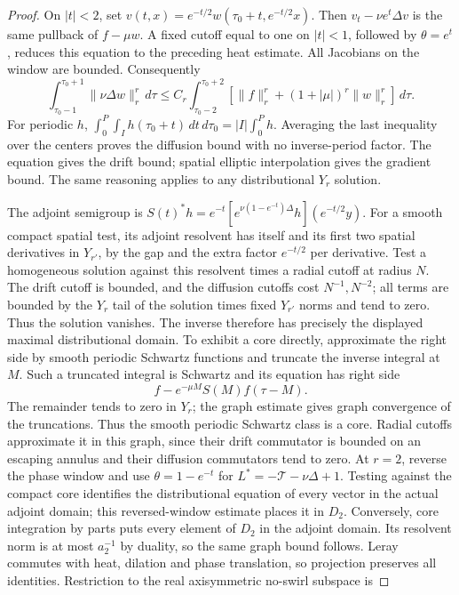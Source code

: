 \begin{proof}
On \(|t|<2\), set
\(v(t,x)=e^{-t/2}w(\tau_0+t,e^{-t/2}x)\).
Then \(v_t-\nu e^t\Delta v\) is the same pullback of \(f-\mu w\).
A fixed cutoff equal to one on \(|t|<1\), followed by
\(\theta=e^t\), reduces this equation to the preceding heat estimate.
All Jacobians on the window are bounded. Consequently
\[
 \int_{\tau_0-1}^{\tau_0+1}\|\nu\Delta w\|_r^r\,d\tau
 \le C_r\int_{\tau_0-2}^{\tau_0+2}
       [\|f\|_r^r+(1+|\mu|)^r\|w\|_r^r]\,d\tau.
\]
For periodic \(h\),
\(\int_0^P\int_Ih(\tau_0+t)\,dt\,d\tau_0
=|I|\int_0^Ph\).
Averaging the last inequality over the centers proves the diffusion
bound with no inverse-period factor. The equation gives the drift
bound; spatial elliptic interpolation gives the gradient bound.
The same reasoning applies to any distributional \(Y_r\) solution.

The adjoint semigroup is
\(S(t)^*h=e^{-t}[e^{\nu(1-e^{-t})\Delta}h](e^{-t/2}y)\).
For a smooth compact spatial test, its adjoint resolvent has itself and
its first two spatial derivatives in \(Y_{r'}\), by the gap and the
extra factor \(e^{-t/2}\) per derivative. Test a homogeneous solution
against this resolvent times a radial cutoff at radius \(N\).
The drift cutoff is bounded, and the diffusion cutoffs cost
\(N^{-1},N^{-2}\); all terms are bounded by the \(Y_r\) tail of the
solution times fixed \(Y_{r'}\) norms and tend to zero. Thus the
solution vanishes. The inverse therefore has precisely the displayed
maximal distributional domain. To exhibit a core directly, approximate
the right side by smooth periodic Schwartz functions and truncate the
inverse integral at \(M\). Such a truncated integral is Schwartz and
its equation has right side
\[
 f-e^{-\mu M}S(M)f(\tau-M).
\]
The remainder tends to zero in \(Y_r\); the graph estimate gives
graph convergence of the truncations. Thus the smooth periodic
Schwartz class is a core. Radial cutoffs approximate it in this graph,
since their drift commutator is bounded on an escaping annulus and
their diffusion commutators tend to zero. At \(r=2\), reverse
the phase window and use \(\theta=1-e^{-t}\) for
\(L^*=-\mathcal T-\nu\Delta+1\). Testing against the compact core
identifies the distributional equation of every vector in the actual
adjoint domain; this reversed-window estimate places it in \(D_2\).
Conversely, core integration by parts puts every element of \(D_2\)
in the adjoint domain. Its resolvent norm is at most \(a_2^{-1}\)
by duality, so the same graph bound follows. Leray commutes with
heat, dilation and phase translation, so projection preserves all
identities. Restriction to the real axisymmetric no-swirl subspace is

\end{proof}
